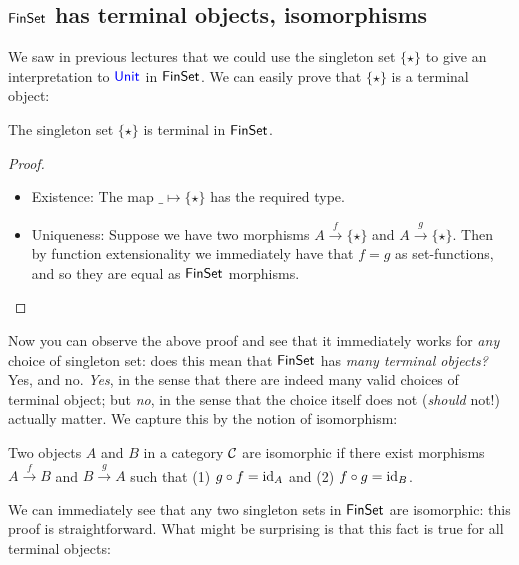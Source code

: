 \subsection{$\mathsf{FinSet}$ has terminal objects, isomorphisms}
We saw in previous lectures that we could use the singleton set 
$\{\star\}$ to give an interpretation to $\mathsf{{\color{blue}Unit}}$ in $\mathsf{FinSet}$.
We can easily prove that $\{\star\}$ is a terminal object:
\begin{theorem}
  The singleton set $\{\star\}$ is terminal in $\mathsf{FinSet}$.
\end{theorem}
\begin{proof}
  \begin{itemize}
    \item Existence: The map $\_ \mapsto \{\star\}$ has the required type.
    \item Uniqueness: Suppose we have two morphisms $A \xrightarrow{f} \{\star\}$ and
    $A \xrightarrow{g} \{\star\}$. 
    Then by function extensionality we immediately have that $f = g$ 
    as set-functions, and so they are equal as $\mathsf{FinSet}$ morphisms.
  \end{itemize}
\end{proof}

Now you can observe the above proof and see that it immediately 
works for \emph{any} choice of singleton set: does this mean that $\mathsf{FinSet}$
has \emph{many terminal objects?} Yes, and no. \emph{Yes}, in the sense 
that there are indeed many valid choices of terminal object; but \emph{no}, 
in the sense that the choice itself does not (\emph{should} not!) actually 
matter. We capture this by the notion of isomorphism:

\begin{definition}
  \sloppy
  Two objects $A$ and $B$ in a category $\mathcal C$ are isomorphic if 
  there exist morphisms $A \xrightarrow{f} B$ and $B \xrightarrow{g} A$
  such that (1) $g \circ f = \operatorname{id}_A$ and (2) $f \circ g = \operatorname{id}_B$.
\end{definition}

We can immediately see that any two singleton sets in $\mathsf{FinSet}$ are isomorphic:
this proof is straightforward. What might be surprising is that this 
fact is true for all terminal objects:

